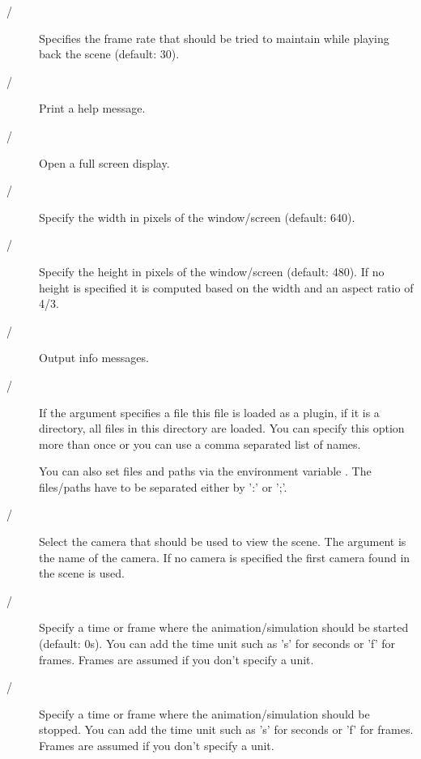 \begin{description}
\item[ / ] 
Specifies the frame rate that should be tried to maintain while playing
back the scene (default: 30).

\item[ / ]
Print a help message.

\item[ / ]
Open a full screen display.

\item[ / ]
Specify the width in pixels of the window/screen (default: 640).

\item[ / ]
Specify the height in pixels of the window/screen (default: 480). If
no height is specified it is computed based on the width and an aspect
ratio of 4/3.

\item[ / ]
Output info messages.

\item[ / ]
If the argument specifies a file this file is loaded as a plugin, if it
is a directory, all files in this directory are loaded. You can specify
this option more than once or you can use a comma separated list of names.

You can also set files and paths via the environment variable
. The files/paths have to be separated either
by ':' or ';'.

\item[ / ]
Select the camera that should be used to view the scene. The argument
is the name of the camera. If no camera is specified the first camera
found in the scene is used.

\item[ / ]
Specify a time or frame where the animation/simulation should be started
(default: 0s). You can add the time unit such as 's' for seconds or 'f'
for frames. Frames are assumed if you don't specify a unit.

\item[ / ]
Specify a time or frame where the animation/simulation should be stopped.
You can add the time unit such as 's' for seconds or 'f' for frames. 
Frames are assumed if you don't specify a unit.


\end{description}
